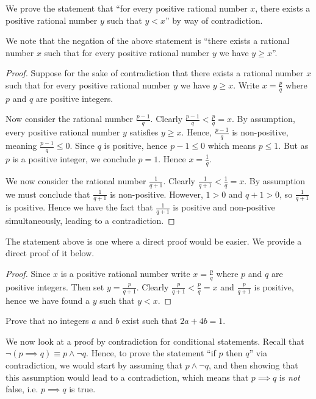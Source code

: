 \begin{example}
    We prove the statement that ``for every positive rational number $x$, there exists a positive rational number $y$ such that $y < x$'' by way of contradiction.

    We note that the negation of the above statement is ``there exists a rational number $x$ such that for every positive rational number $y$ we have $y \geq x$''.
    \begin{proof}
        Suppose for the sake of contradiction that there exists a rational number $x$ such that for every positive rational number $y$ we have $y \geq x$. Write $x = \frac pq$ where $p$ and $q$ are positive integers.

        Now consider the rational number $\frac{p-1}{q}$. Clearly $\frac{p-1}{q} < \frac pq = x$. By assumption, every positive rational number $y$ satisfies $y \geq x$. Hence, $\frac{p-1}{q}$ is non-positive, meaning $\frac{p-1}{q} \leq 0$. Since $q$ is positive, hence $p - 1 \leq 0$ which means $p \leq 1$. But as $p$ is a positive integer, we conclude $p = 1$. Hence $x = \frac 1q$.

        We now consider the rational number $\frac{1}{q+1}$. Clearly $\frac{1}{q+1} < \frac{1}{q} = x$. By assumption we must conclude that $\frac{1}{q+1}$ is non-positive. However, $1 > 0$ and $q + 1 > 0$, so $\frac{1}{q+1}$ is positive. Hence we have the fact that $\frac{1}{q+1}$ is positive and non-positive simultaneously, leading to a contradiction.
    \end{proof}
\end{example}
\begin{remark}
    The statement above is one where a direct proof would be easier. We provide a direct proof of it below.
    \begin{proof}
        Since $x$ is a positive rational number write $x = \frac pq$ where $p$ and $q$ are positive integers. Then set $y = \frac{p}{q+1}$. Clearly $\frac{p}{q+1} < \frac{p}{q} = x$ and $\frac{p}{q+1}$ is positive, hence we have found a $y$ such that $y < x$.
    \end{proof}
\end{remark}

\begin{exercise}
    Prove that no integers $a$ and $b$ exist such that $2a + 4b = 1$.
\end{exercise}

We now look at a proof by contradiction for conditional statements. Recall that $\lnot(p \implies q) \equiv p \land \lnot q$. Hence, to prove the statement ``if $p$ then $q$'' via contradiction, we would start by assuming that $p \land \lnot q$, and then showing that this assumption would lead to a contradiction, which means that $p \implies q$ is \textit{not} false, i.e. $p \implies q$ is true.

